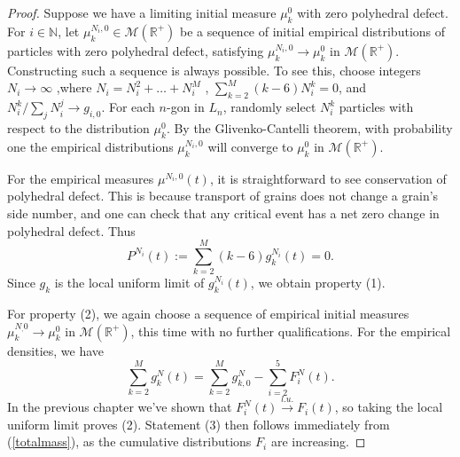 \begin{proof}
Suppose we have a limiting initial measure $\mu_k^0$ with zero polyhedral defect. For $i \in \mathbb N$, let $\mu_k^{N_i,0}\in \mathcal M(\mathbb R^+)$  be a sequence of initial empirical distributions of particles with zero polyhedral defect, satisfying $\mu_k^{N_i,0} \rightarrow \mu_k^0 $ in $\mathcal M(\mathbb{R}^+)$. Constructing such a sequence is always possible. To see this, choose integers $N_i \rightarrow \infty$  ,where $N_i= N_i^2+\dots+N_i^M$ , $\sum_{k = 2}^M (k-6)N_i^k = 0 $, and $N_i^k/\sum_j N_i^j \rightarrow g_{i,0}$. For each $n$-gon in $L_n$, randomly select $N_i^k$ particles with respect to the distribution $\mu_k^0$.  By the Glivenko-Cantelli theorem, with probability one the empirical distributions  $\mu_k^{N_i,0}$ will converge  to $\mu_k^0$ in $\mathcal M(\mathbb{R}^+)$.  
 
For the empirical measures $\mu^{N_i,0}(t)$, it is straightforward to see conservation of polyhedral defect.  This is because transport of grains does not change a grain's side number, and one can check that any critical event has a net zero change in polyhedral defect. Thus  
\begin{equation}
P^{N_i}(t) :=\sum_{k = 2}^M(k-6)g_k^{N_i}(t)= 0.     
\end{equation}
Since $g_k$ is the local uniform limit of $g_k^{N_i}(t)$, we obtain property (1).

For property (2), we again choose a sequence of empirical initial measures $\mu_k^{N_,0} \rightarrow \mu_k^0 $ in $\mathcal M(\mathbb{R}^+)$, this time with no further qualifications. For the empirical densities, we have 
\begin{equation}\label{totalmass}
\sum_{k =2}^M g_k^N(t) =  \sum_{k = 2}^M g_{k,0}^{N}-\sum_{i = 2}^5 F_i^N(t). \end{equation}
In the previous chapter we've shown that $F_i^N(t) \xrightarrow{l.u.} F_i(t)$, so taking the local uniform limit proves (2).  Statement (3) then follows immediately from (\ref{totalmass}), as the cumulative distributions $F_i$ are increasing.     
\end{proof}



